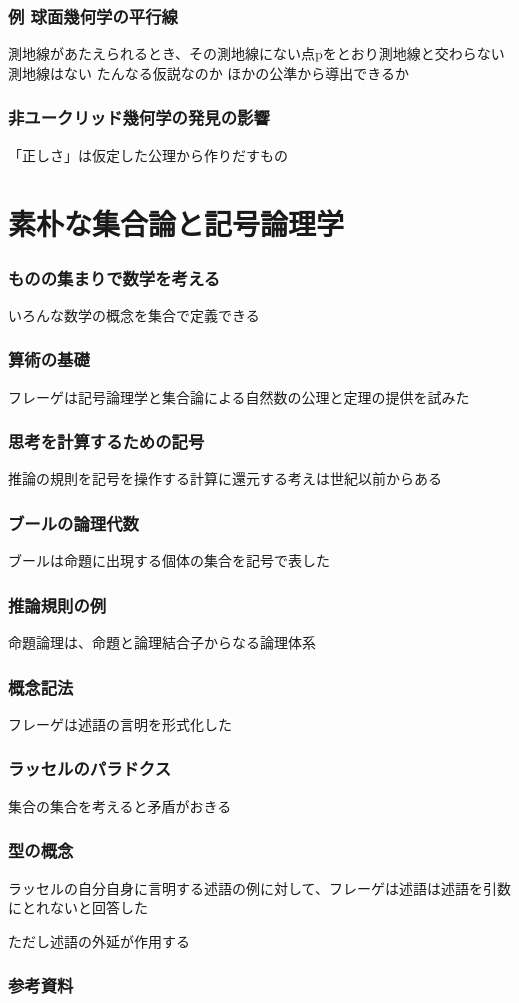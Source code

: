 \documentclass[unicode, 14pt, aspectratio=169]{beamer}
\begin{document}
\begin{frame}
  \frametitle{例 球面幾何学の平行線}
  {\large 測地線があたえられるとき、その測地線にない点pをとおり測地線と交わらない測地線はない}
  たんなる仮説なのか
  ほかの公準から導出できるか
\end{frame}
\begin{frame}
  \frametitle{非ユークリッド幾何学の発見の影響}
  {\large 「正しさ」は仮定した公理から作りだすもの}
\end{frame}
\section{素朴な集合論と記号論理学}
\begin{frame}
  \frametitle{ものの集まりで数学を考える}
  {\large いろんな数学の概念を集合で定義できる}
\end{frame}
\begin{frame}
  \frametitle{算術の基礎}
  {\large フレーゲは記号論理学と集合論による自然数の公理と定理の提供を試みた}
\end{frame}
\begin{frame}
  \frametitle{思考を計算するための記号}
  {\large 推論の規則を記号を操作する計算に還元する考えは世紀以前からある}
\end{frame}
\begin{frame}
  \frametitle{ブールの論理代数}
  {\large ブールは命題に出現する個体の集合を記号で表した}
\end{frame}
\begin{frame}
  \frametitle{推論規則の例}
  {\large 命題論理は、命題と論理結合子からなる論理体系}
\end{frame}
\begin{frame}
  \frametitle{概念記法}
  {\large フレーゲは述語の言明を形式化した}
\end{frame}
\begin{frame}
  \frametitle{ラッセルのパラドクス}
  {\large 集合の集合を考えると矛盾がおきる}
\end{frame}
\begin{frame}
  \frametitle{型の概念}
  ラッセルの自分自身に言明する述語の例に対して、フレーゲは述語は述語を引数にとれないと回答した

  ただし述語の外延が作用する
\end{frame}
\begin{frame}[allowframebreaks,t]
  \frametitle{参考資料}
  \printbibliography
  \nocite{*}
\end{frame}
\end{document}
